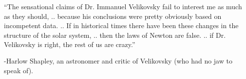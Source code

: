 \begin{footnotesize}
\begin{sffamily}
``The sensational claims of Dr. Immanuel Velikovsky fail to interest me as much as they should, .. because his conclusions were pretty obviously based on incompetent data. .. If in historical times there have been these changes in the structure of the solar system, .. then the laws of Newton are false. .. if Dr. Velikovsky is right, the rest of us are crazy.''

-Harlow Shapley, an astronomer and critic of Velikovsky (who had no jaw to speak of).

\end{sffamily}
\end{footnotesize}

